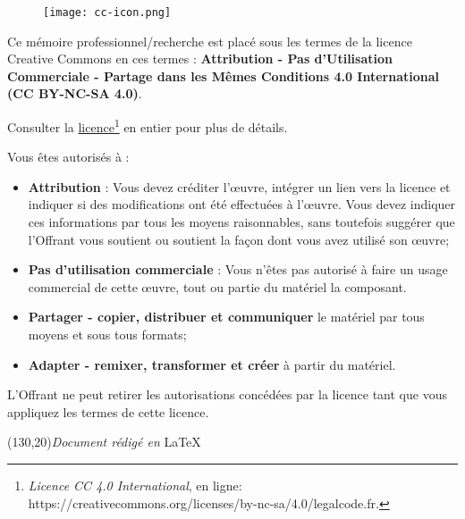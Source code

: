         \begin{figure}[H]
            \centering
            \texttt{[image: cc-icon.png]}
            \label{traitement}
        \end{figure}

    Ce mémoire professionnel/recherche est placé sous les termes de la licence Creative Commons en ces termes : \textbf{Attribution - Pas d'Utilisation Commerciale - Partage dans les Mêmes Conditions 4.0 International (CC BY-NC-SA 4.0)}.
\bigskip

    Consulter la \href{https://creativecommons.org/licenses/by-nc-sa/4.0/legalcode.fr}{licence\footnote{
\textit{Licence CC 4.0 International}, en ligne: \url{https://creativecommons.org/licenses/by-nc-sa/4.0/legalcode.fr}.}} en entier pour plus de détails. 
\bigskip

    Vous êtes autorisés à :
    \begin{itemize}
        \item \textbf{Attribution} : Vous devez créditer l'\oe uvre, intégrer un lien vers la licence et indiquer si des modifications ont été effectuées à l'\oe uvre. Vous devez indiquer ces informations par tous les moyens raisonnables, sans toutefois suggérer que l'Offrant vous soutient ou soutient la façon dont vous avez utilisé son \oe uvre;
        \item \textbf{Pas d'utilisation commerciale} : Vous n'êtes pas autorisé à faire un usage commercial de cette \oe uvre, tout ou partie du matériel la composant. 
        \item \textbf{Partager - copier, distribuer et communiquer} le matériel par tous moyens et sous tous formats;
        \item \textbf{Adapter - remixer, transformer et créer} à partir du matériel.
    \end{itemize}
\bigskip

L'Offrant ne peut retirer les autorisations concédées par la licence tant que vous appliquez les termes de cette licence.
\bigskip
\bigskip
\bigskip
\bigskip
\bigskip
\bigskip
\bigskip
\bigskip
\bigskip
\bigskip
\bigskip
\bigskip
\bigskip
\bigskip
\bigskip
\bigskip
\bigskip
\bigskip
\bigskip
\begin{center}
\framebox(130,20){\small{\textit{Document rédigé en} \LaTeX}}
\end{center}
\newpage
\thispagestyle{empty}